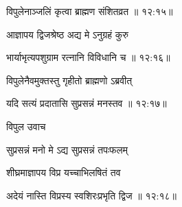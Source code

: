 
{\devanagarifont विपुलेनाञ्जलिं कृत्वा ब्राह्मण संशितव्रत {॥ १२:१५॥} \veg\dontdisplaylinenum }%

{\devanagarifont आज्ञापय द्विजश्रेष्ठ अद्य मे ऽनुग्रहं कुरु \thinspace{\dandab} \dontdisplaylinenum }%


{\devanagarifont भार्याभृत्यपशुग्राम रत्नानि विविधानि च {॥ १२:१६॥} \veg\dontdisplaylinenum }%

{\devanagarifont विपुलेनैवमुक्तस्तु गृहीतो ब्राह्मणो ऽब्रवीत् \thinspace{\dandab} \dontdisplaylinenum }%


{\devanagarifont यदि सत्यं प्रदातासि सुप्रसन्नं मनस्तव {॥ १२:१७॥} \veg\dontdisplaylinenum }%
     \var{{\devanagarifont \numnoemph\vc \lem \mssALL, \om\ \msCc}}%

{\devanagarifont विपुल उवाच {\dandab}\dontdisplaylinenum  }%
 
{\devanagarifont सुप्रसन्नं मनो मे ऽद्य सुप्रसन्नं तपःफलम् \thinspace{\danda} \dontdisplaylinenum }%

{\devanagarifont शीघ्रमाज्ञापय विप्र यच्चाभिलषितं तव  \danda\dontdisplaylinenum }%


{\devanagarifont अदेयं नास्ति विप्रस्य स्वशिरःप्रभृति द्विज {॥ १२:१८॥} \veg\dontdisplaylinenum }%

